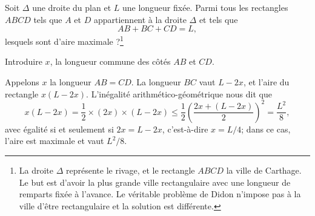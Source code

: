\begin{multicols}{2}
\begin{exo}

Soit $\Delta$ une droite du plan et $L$ une longueur fixée.
Parmi tous les rectangles $ABCD$ tels que $A$ et $D$ appartiennent à la droite $\Delta$ et tels que 
\[ AB+BC+CD=L,\] lesquels sont d'aire maximale ?\footnote{La droite $\Delta$ représente le rivage, et le rectangle $ABCD$ la ville de Carthage. Le but est d'avoir la plus grande ville rectangulaire avec une longueur de remparts fixée à l'avance. Le véritable \og problème de Didon\fg{} n'impose pas à la ville d'être rectangulaire et la solution est différente.}


\begin{hint}
Introduire $x$, la longueur commune des côtés $AB$ et $CD$.
\end{hint}

\begin{sol}
Appelons $x$ la longueur $AB=CD$. La longueur $BC$ vaut $L-2x$, et l'aire du rectangle $x(L-2x)$. L'inégalité arithmético-géométrique nous dit que
$$x(L-2x) = \frac12 \times (2x)\times (L-2x) \le \frac12  \left( \frac{2x+(L-2x)}2 \right)^2=\frac{L^2}8,$$
avec égalité si et seulement si $2x=L-2x$, c'est-à-dire $x=L/4$; dans ce cas, l'aire est maximale et vaut $L^2/8$.
\end{sol}
\end{exo}
\end{multicols}

